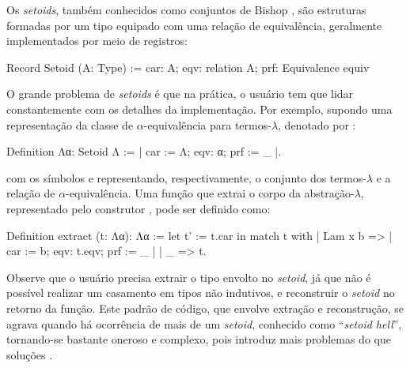 Os \textit{setoids}, também conhecidos como conjuntos de Bishop \cite{Barthe2003,Bishop2012}, são estruturas formadas por um tipo equipado com uma relação de equivalência, geralmente implementados por meio de registros:
\begin{coqcode}
Record Setoid (A: Type) := {
   car: A; 
   eqv: relation A; 
   prf: Equivalence equiv
}
\end{coqcode}
O grande problema de \textit{setoids} é que na prática, o usuário tem que lidar constantemente com os detalhes da implementação. Por exemplo, supondo uma representação da classe de $\alpha$-equivalência para termos-$\lambda$, denotado por :
\begin{coqcode}
Definition Λα: Setoid Λ := {| car := Λ; eqv: α; prf := _ |}.
\end{coqcode}
com os símbolos  e  representando, respectivamente, o conjunto dos termos-$\lambda$ e a relação de $\alpha$-equivalência. 
Uma função que extrai o corpo da abstração-$\lambda$, representado pelo construtor , pode ser definido como:
\begin{coqcode}
Definition extract (t: Λα): Λα :=
   let t' := t.car in
   match t with
   | Lam x b => {| car := b; eqv: t.eqv; prf := _ |}
   | _ => t.
\end{coqcode}
Observe que o usuário precisa extrair o tipo envolto no \textit{setoid}, já que não é possível realizar um casamento em tipos não indutivos, e reconstruir o \textit{setoid} no retorno da função. Este padrão de código, que envolve extração e reconstrução, se agrava quando há ocorrência de mais de um \textit{setoid}, conhecido como ``\textit{setoid hell}'', tornando-se bastante oneroso e complexo, pois introduz mais problemas do que soluções \cite{Altenkirch2017}.

